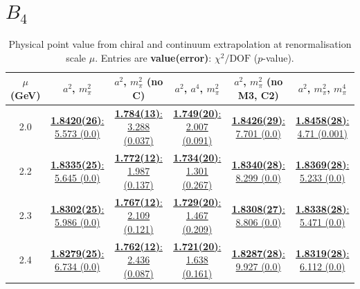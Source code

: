 \documentclass[12pt]{extarticle}
\begin{document}
\section{$B_4$}
\begin{table}[h!]
\begin{center}
\begin{tabular}{|c|c|c|c|c|c|}
\hline
$\mu$ (GeV) & $a^2$, $m_\pi^2$& $a^2$, $m_\pi^2$ (no C)& $a^2$, $a^4$, $m_\pi^2$& $a^2$, $m_\pi^2$ (no M3, C2)& $a^2$, $m_\pi^2$, $m_\pi^4$\\
\hline
2.0& \hyperlink{SSpPP/SUSY/a2m2_20.pdf.1}{\textbf{1.8420(26)}: 5.573 (0.0)} & \hyperlink{SSpPP/SUSY/a2m2noC_20.pdf.1}{\textbf{1.784(13)}: 3.288 (0.037)} & \hyperlink{SSpPP/SUSY/a2a4m2_20.pdf.1}{\textbf{1.749(20)}: 2.007 (0.091)} & \hyperlink{SSpPP/SUSY/a2m2mcut_20.pdf.1}{\textbf{1.8426(29)}: 7.701 (0.0)} & \hyperlink{SSpPP/SUSY/a2m2m4_20.pdf.1}{\textbf{1.8458(28)}: 4.71 (0.001)}\\
2.2& \hyperlink{SSpPP/SUSY/a2m2_22.pdf.1}{\textbf{1.8335(25)}: 5.645 (0.0)} & \hyperlink{SSpPP/SUSY/a2m2noC_22.pdf.1}{\textbf{1.772(12)}: 1.987 (0.137)} & \hyperlink{SSpPP/SUSY/a2a4m2_22.pdf.1}{\textbf{1.734(20)}: 1.301 (0.267)} & \hyperlink{SSpPP/SUSY/a2m2mcut_22.pdf.1}{\textbf{1.8340(28)}: 8.299 (0.0)} & \hyperlink{SSpPP/SUSY/a2m2m4_22.pdf.1}{\textbf{1.8369(28)}: 5.233 (0.0)}\\
2.3& \hyperlink{SSpPP/SUSY/a2m2_23.pdf.1}{\textbf{1.8302(25)}: 5.986 (0.0)} & \hyperlink{SSpPP/SUSY/a2m2noC_23.pdf.1}{\textbf{1.767(12)}: 2.109 (0.121)} & \hyperlink{SSpPP/SUSY/a2a4m2_23.pdf.1}{\textbf{1.729(20)}: 1.467 (0.209)} & \hyperlink{SSpPP/SUSY/a2m2mcut_23.pdf.1}{\textbf{1.8308(27)}: 8.806 (0.0)} & \hyperlink{SSpPP/SUSY/a2m2m4_23.pdf.1}{\textbf{1.8338(28)}: 5.471 (0.0)}\\
2.4& \hyperlink{SSpPP/SUSY/a2m2_24.pdf.1}{\textbf{1.8279(25)}: 6.734 (0.0)} & \hyperlink{SSpPP/SUSY/a2m2noC_24.pdf.1}{\textbf{1.762(12)}: 2.436 (0.087)} & \hyperlink{SSpPP/SUSY/a2a4m2_24.pdf.1}{\textbf{1.721(20)}: 1.638 (0.161)} & \hyperlink{SSpPP/SUSY/a2m2mcut_24.pdf.1}{\textbf{1.8287(28)}: 9.927 (0.0)} & \hyperlink{SSpPP/SUSY/a2m2m4_24.pdf.1}{\textbf{1.8319(28)}: 6.112 (0.0)}\\
\hline
\end{tabular}
\caption{Physical point value from chiral and continuum extrapolation at renormalisation scale $\mu$. Entries are \textbf{value(error)}: $\chi^2/\text{DOF}$ ($p$-value).}
\end{center}
\end{table}
\end{document}
